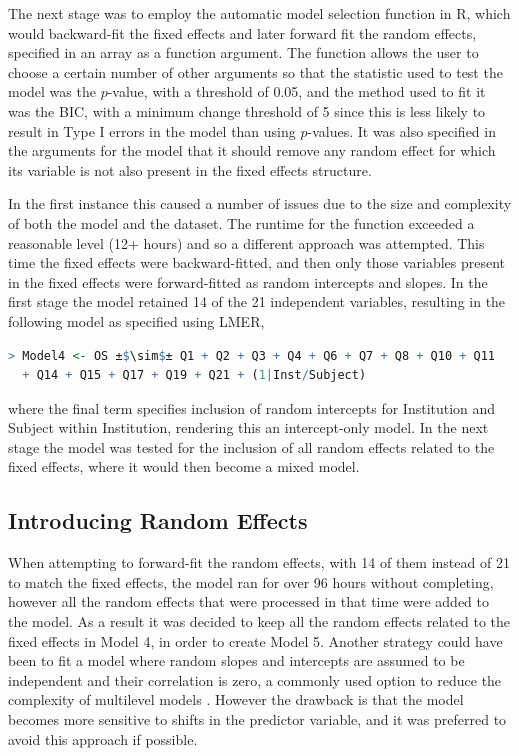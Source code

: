 \documentclass[11pt,a4paper]{report}
\begin{document}
The next stage was to employ the automatic model selection function in R, which would backward-fit the fixed effects and later forward fit the random effects, specified in an array as a function argument. The function allows the user to choose a certain number of other arguments so that the statistic used to test the model was the $p$-value, with a threshold of 0.05, and the method used to fit it was the BIC, with a minimum change threshold of 5 since this is less likely to result in Type I errors in the model than using $p$-values. It was also specified in the arguments for the model that it should remove any random effect for which its variable is not also present in the fixed effects structure. 

In the first instance this caused a number of issues due to the size and complexity of both the model and the dataset. The runtime for the function exceeded a reasonable level (12+ hours) and so a different approach was attempted. This time the fixed effects were backward-fitted, and then only those variables present in the fixed effects were forward-fitted as random intercepts and slopes. 
In the first stage the model retained 14 of the 21 independent variables, resulting in the following model as specified using LMER, 

{\footnotesize
\begin{lstlisting}[backgroundcolor = \color{light-gray}, language=R, escapechar=±]
 > Model4 <- OS ±$\sim$± Q1 + Q2 + Q3 + Q4 + Q6 + Q7 + Q8 + Q10 + Q11 
  + Q14 + Q15 + Q17 + Q19 + Q21 + (1|Inst/Subject)
\end{lstlisting}
}
where the final term specifies inclusion of random intercepts for Institution and Subject within Institution, rendering this an intercept-only model. In the next stage the model was tested for the inclusion of all random effects related to the fixed effects, where it would then become a mixed model.

\subsection{Introducing Random Effects}
When attempting to forward-fit the random effects, with 14 of them instead of 21 to match the fixed effects, the model ran for over 96 hours without completing, however all the random effects that were processed in that time were added to the model. As a result it was decided to keep all the random effects related to the fixed effects in Model 4, in order to create Model 5. Another strategy could have been to fit a model where random slopes and intercepts are assumed to be independent and their correlation is zero, a commonly used option to reduce the complexity of multilevel models \cite{bates2014fitting}. However the drawback is that the model becomes more sensitive to shifts in the predictor variable, and it was preferred to avoid this approach if possible. 
\end{document}
